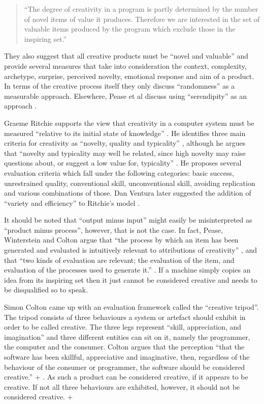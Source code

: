 \begin{quote}
  ``The degree of creativity in a program is partly determined by the number of novel items of value it produces. Therefore we are interested in the set of valuable items produced by the program which exclude those in the inspiring set.'' \autocite[p.3]{Colton2001}
\end{quote}

They also suggest that all creative products must be ``novel and valuable'' \citeyear[p.1]{Pease2001} and provide several measures that take into consideration the context, complexity, archetype, surprise, perceived novelty, emotional response and aim of a product. In terms of the creative process itself they only discuss ``randomness'' as a measurable approach. Elsewhere, Pease et al discuss using ``serendipity'' as an approach \citeyear{Pease2013}.

Graeme Ritchie supports the view that creativity in a computer system must be measured ``relative to its initial state of knowledge'' \autocite[p.72]{Ritchie2007}. He identifies three main criteria for creativity as ``novelty, quality and typicality'' \citeyear[p.72-73]{Ritchie2007}, although he argues that ``novelty and typicality may well be related, since high novelty may raise questions about, or suggest a low value for, typicality'' \citeyear[p.73]{Ritchie2007} \citeyear[see also][]{Ritchie2001}. He proposes several evaluation criteria which fall under the following categories: \autocite[p.91-92]{Ritchie2007} basic success, unrestrained quality, conventional skill, unconventional skill, avoiding replication and various combinations of those. Dan Ventura later suggested the addition of ``variety and efficiency'' to Ritchie's model \citeyear[p.7]{Ventura2008}.

It should be noted that ``output minus input'' might easily be misinterpreted as ``product minus process'', however, that is not the case. In fact, Pease, Winterstein and Colton argue that ``the process by which an item has been generated and evaluated is intuitively relevant to attributions of creativity'' \citeyear[p.6]{Pease2001}, and that ``two kinds of evaluation are relevant; the evaluation of the item, and evaluation of the processes used to generate it.'' \citeyear[p.7]{Pease2001}. If a machine simply copies an idea from its inspiring set then it just cannot be considered creative and needs to be disqualified so to speak.

Simon Colton came up with an evaluation framework called the ``creative tripod''. The tripod consists of three behaviours a system or artefact should exhibit in order to be called creative. The three legs represent ``skill, appreciation, and imagination'' and three different entities can sit on it, namely the programmer, the computer and the consumer. Colton argues that the perception ``that the software has been skillful, appreciative and imaginative, then, regardless of the behaviour of the consumer or programmer, the software should be considered creative.'' \citeyear[p.5]{Colton2008a} + \citeyear[p.5]{Colton2008}. As such a product can be considered creative, if it appears to be creative. If not all three behaviours are exhibited, however, it should not be considered creative. \autocite[p.5]{Colton2008a} + \autocite[p.5]{Colton2008}

